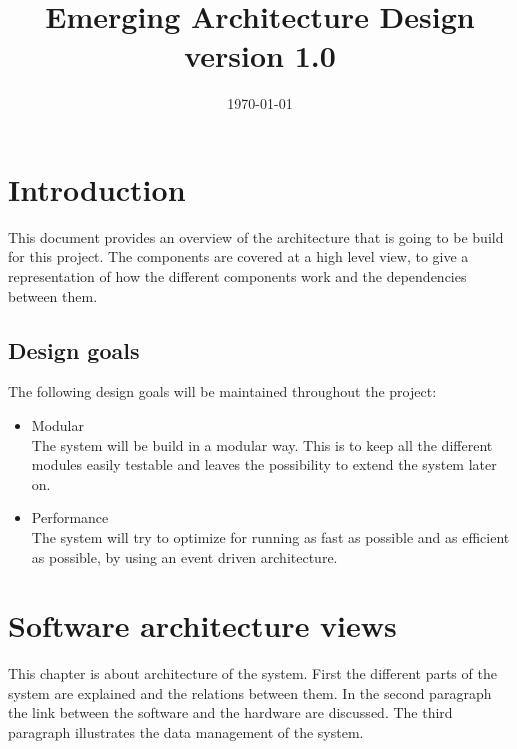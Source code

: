 \documentclass[11pt,a4paper]{article}
\begin{document}
\setlength{\droptitle}{-5em}
\title{
Emerging Architecture Design\\ 
version 1.0
}
\date{\today}
\maketitle

\section{Introduction}
This document provides an overview of the architecture that is going to be build for this project. The components are covered at a high level view, to give a representation of how the different components work and the dependencies between them.

\subsection{Design goals}
The following design goals will be maintained throughout the project:
\begin{itemize}
\item
Modular
\\
The system will be build in a modular way. This is to keep all the different modules easily testable and leaves the possibility to extend the system later on.

\item
Performance
\\
The system will try to optimize for running as fast as possible and as efficient as possible, by using an event driven architecture.
\end{itemize}

\section{Software architecture views}
This chapter is about architecture of the system. First the different parts of the system are explained and the relations between them. In the second paragraph the link between the software and the hardware are discussed. The third paragraph illustrates the data management of the system.
\end{document}
